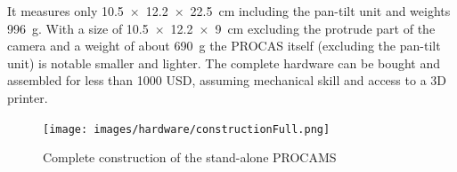 It measures only \SI{10.5 x 12.2 x 22.5}{\cm} including the pan-tilt unit and weights \SI{996}{\g}. With a size of \SI{10.5x12.2x9}{\cm} excluding the protrude part of the camera and a weight of about \SI{690}{\g} the PROCAS itself (excluding the pan-tilt unit) is notable smaller and lighter.
The complete hardware can be bought and assembled for less than 1000 USD, assuming mechanical skill and access to a 3D printer. 

\begin{figure} 
\centering 
                \texttt{[image: images/hardware/constructionFull.png]}
                \caption{Complete construction of the stand-alone PROCAMS}
                \label{img:finalConstruction}
\end{figure}
